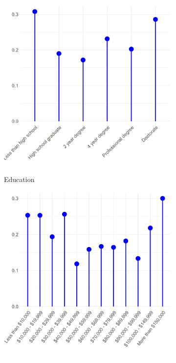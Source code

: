 \documentclass[12pt]{article}
\begin{document}
\begin{figure}[ht!]
\begin{subfigure}[b]{0.45\textwidth}
        \includegraphics[width=1.0\textwidth]{Plots/uni-dist-cat-tol-edu.png}
            \caption{Education}
            \label{fig:cat-tol-edu}
    \end{subfigure}
     \begin{subfigure}[b]{0.45\textwidth}
        \includegraphics[width=1.0\textwidth]{Plots/uni-dist-cat-tol-inc.png}

\end{subfigure}
\end{figure}
\end{document}
